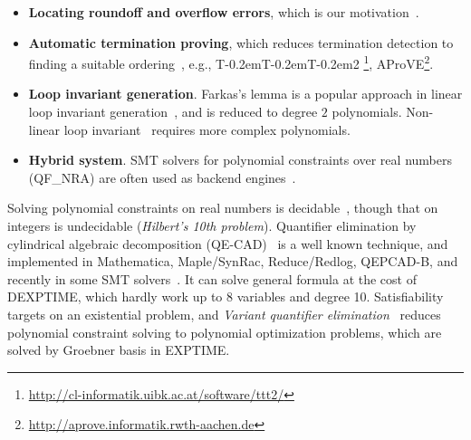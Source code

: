 \documentclass[runningheads,a4paper,oribibl]{llncs}
\newcommand\TTTT{%
 \textsf{T\kern-0.2em\raisebox{-0.3em}T\kern-0.2emT\kern-0.2em\raisebox{-0.3em}2}%
}
\begin{document}
\begin{itemize}
\item {\bf Locating roundoff and overflow errors}, 
which is our motivation~\cite{Ngoc:2009:ORE:1685167.1685421}. 

\item {\bf Automatic termination proving}, 
which reduces termination detection to finding a suitable ordering~\cite{Lucas:2008:CCS:1361735.1361760}, 
e.g., \TTTT\footnote{\url{http://cl-informatik.uibk.ac.at/software/ttt2/}}, 
AProVE\footnote{\url{http://aprove.informatik.rwth-aachen.de}}. 

\item {\bf Loop invariant generation}. 
Farkas's lemma is a popular approach in linear loop invariant generation~\cite{Colon}, 
and is reduced to degree $2$ polynomials. 
Non-linear loop invariant~\cite{Sankaranarayanan:2004:NLI:982962.964028} requires more complex polynomials.

\item {\bf Hybrid system}. SMT solvers for polynomial constraints over real numbers (QF\_NRA) are often used as backend engines~\cite{Sankaranarayanan04constructinginvariants}. 

\end{itemize}	

Solving polynomial constraints on real numbers is decidable~\cite{tarski}, 
though that on integers is undecidable ({\em Hilbert's 10th problem}). 
Quantifier elimination by cylindrical algebraic decomposition (QE-CAD)~\cite{qecad} 
is a well known technique, and 
implemented in Mathematica, Maple/SynRac, Reduce/Redlog, QEPCAD-B, and recently 
in some SMT solvers~\cite{Jovanovic13}. 
It can solve general formula at the cost of DEXPTIME, which hardly work up to 8 variables and degree 10.
Satisfiability targets on an existential problem, and 
{\em Variant quantifier elimination}~\cite{Hong2012883} reduces polynomial constraint solving to 
polynomial optimization problems, which are solved by Groebner basis in EXPTIME. 
\end{document}

